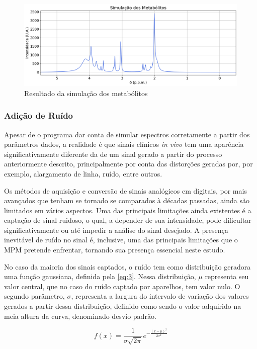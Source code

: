 \documentclass[12pt]{article}
\begin{document}
\begin{figure} [H]
    \includegraphics[scale=0.37]{metabolites.png}
    \centering
    \caption{Resultado da simulação dos metabólitos}
    \label{fig:4}
\end{figure}

\subsubsection{Adição de Ruído}
Apesar de o programa dar conta de simular espectros corretamente a partir dos parâmetros dados, a realidade é que sinais clínicos \textit{in vivo} tem uma aparência significativamente 
diferente da de um sinal gerado a partir do processo anteriormente descrito, principalmente por conta das distorções geradas por, por exemplo, alargamento de linha, ruído, entre outros. 

Os métodos de aquisição e conversão de sinais analógicos em digitais, por mais avançados que tenham se tornado se comparados à décadas passadas, ainda são limitados em vários aspectos. Uma das principais 
limitações ainda existentes é a captação de sinal ruidoso, o qual, a depender de sua intensidade, pode dificultar significativamente ou até impedir a análise do sinal desejado. A presença 
inevitável de ruído no sinal é, inclusive, uma das principais limitações que o MPM pretende enfrentar, tornando sua presença essencial neste estudo. 

No caso da maioria dos sinais captados, o ruído tem como distribuição geradora uma função gaussiana, definida pela \autoref{eq:3}. Nessa distribuição, $\mu$ representa seu valor central, 
que no caso do ruído captado por aparelhos, tem valor nulo. O segundo parâmetro, $\sigma$, representa a largura do intervalo de variação dos valores gerados a partir dessa 
distribuição, definido como sendo o valor adquirido na meia altura da curva, denominado desvio padrão.


\begin{equation} \label{eq:3}
    f(x) = \frac{1}{\sigma \sqrt{2\pi}}e^{-\frac{(x - \mu)^2}{2\sigma ^2}}
\end{equation}
\end{document}
